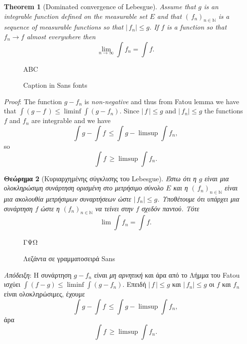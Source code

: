 \documentclass{article}
\newtheorem{theorem}{Theorem}
\newtheorem{theoremg}[theorem]{Θεώρημα}
\begin{document}
\begin{theorem}[Dominated convergence of Lebesgue]
Assume that $g$ is an
in\-te\-grable func\-tion defined on the measurable set $E$ and that
  $(\,f_n)_{n\in\mathbb N}$ is a sequence of mea\-sur\-able functions so that
  $|\,f_n|\leq g$. If $f$ is a function so that $f_n\to f$ almost everywhere
  then $$\lim_{n\to\infty}\int f_n=\int f.$$
\end{theorem}

\begin{figure}\vspace*{-1.8\baselineskip}
\begin{center}
  {\Huge\textsf{\color{lightgray}ABC}}
\end{center}
\caption{Caption in Sans fonts}
\end{figure}
\textit{Proof}: The function $g-f_n$ is \textit{non-negative} and thus from Fatou lemma
we have that $\int(g-f\,)\leq\liminf\int(g-f_n)$. Since $|\,f\,|\leq g$ and
$|\,f_n|\leq g$ the  functions $f$ and $f_n$ are integrable and we have
$$\int g-\int f\,\leq \int g-\limsup\int f_n,$$ so
$$\int f\,\geq \limsup \int f_n.$$
\par



\begin{theoremg}[Κυριαρχημένης σύγκλισης του Lebesgue]
  Έστω ότι
η $g$ είναι μια ολοκληρώσιμη συνάρτηση ορισμένη στο μετρήσιμο σύνολο
$E$ και η $(\,f_n)_{n\in\mathbb N}$ είναι μια ακολουθία μετρήσιμων συναρτήσεων ώστε
$|\,f_n| ≤ g$. Υποθέτουμε ότι υπάρχει μια συνάρτηση $f$
ώστε η  $(f_n)_{n\in\mathbb N}$ να
τείνει στην $f$ σχεδόν παντού. Τότε
$$\lim \int f_n =\int f.$$
\end{theoremg}


\begin{figure}\vspace*{-1.8\baselineskip}
\begin{center}
  {\Huge\textsf{\color{lightgray}ΓΨΩ}}
\end{center}
\caption{Λεζάντα σε γραμματοσειρά Sans}
\end{figure}

\textit{Απόδειξη}: Η συνάρτηση $g − f_n$ είναι \textit{μη αρνητική} και άρα από
το Λήμμα του Fatou ισχύει
$\int (f-g) ≤ \liminf \int (g-f_n)$. Επειδή
$|\,f\,| ≤ g$ και $|\,f_n| ≤g$ οι $f$ και $f_n$ είναι ολοκληρώσιμες, έχουμε
$$\int g −\int f\, ≤ \int g − \limsup\int f_n,$$
άρα
$$\int f\,\geq \limsup \int f_n.$$
\end{document}
